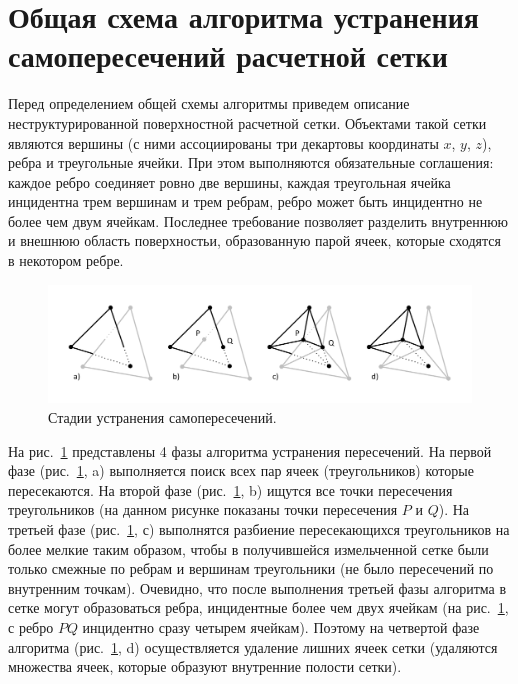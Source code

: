\documentclass[
11pt,%
tightenlines,%
twoside,%
onecolumn,%
nofloats,%
nobibnotes,%
nofootinbib,%
superscriptaddress,%
noshowpacs,%
centertags]%
{revtex4}
\begin{document}
\section{Общая схема алгоритма устранения самопересечений расчетной сетки}

Перед определением общей схемы алгоритмы приведем описание неструктурированной поверхностной расчетной сетки.
Объектами такой сетки являются вершины (с ними ассоциированы три декартовы координаты $x$, $y$, $z$), ребра и треугольные ячейки.
При этом выполняются обязательные соглашения: каждое ребро соединяет ровно две вершины, каждая треугольная ячейка инцидентна трем вершинам и трем ребрам, ребро может быть инцидентно не более чем двум ячейкам.
Последнее требование позволяет разделить внутреннюю и внешнюю область поверхностьи, образованную парой ячеек, которые сходятся в некотором ребре.

\begin{figure}[h]
\includegraphics[width=1.0\textwidth]{pics/pic_algorithm_phases_s.pdf}
\caption{Стадии устранения самопересечений.}\label{fig:pic_algorithm_phases_s}
\end{figure}

На рис.~\ref{fig:pic_algorithm_phases_s} представлены 4 фазы алгоритма устранения пересечений.
На первой фазе (рис.~\ref{fig:pic_algorithm_phases_s}, a) выполняется поиск всех пар ячеек (треугольников) которые пересекаются.
На второй фазе (рис.~\ref{fig:pic_algorithm_phases_s}, b) ищутся все точки пересечения треугольников (на данном рисунке показаны точки пересечения $P$ и $Q$).
На третьей фазе (рис.~\ref{fig:pic_algorithm_phases_s}, с) выполнятся разбиение пересекающихся треугольников на более мелкие таким образом, чтобы в получившейся измельченной сетке были только смежные по ребрам и вершинам треугольники (не было пересечений по внутренним точкам).
Очевидно, что после выполнения третьей фазы алгоритма в сетке могут образоваться ребра, инцидентные более чем двух ячейкам (на рис.~\ref{fig:pic_algorithm_phases_s}, с ребро $PQ$ инцидентно сразу четырем ячейкам).
Поэтому на четвертой фазе алгоритма (рис.~\ref{fig:pic_algorithm_phases_s}, d) осуществляется удаление лишних ячеек сетки (удаляются множества ячеек, которые образуют внутренние полости сетки).
\end{document}
